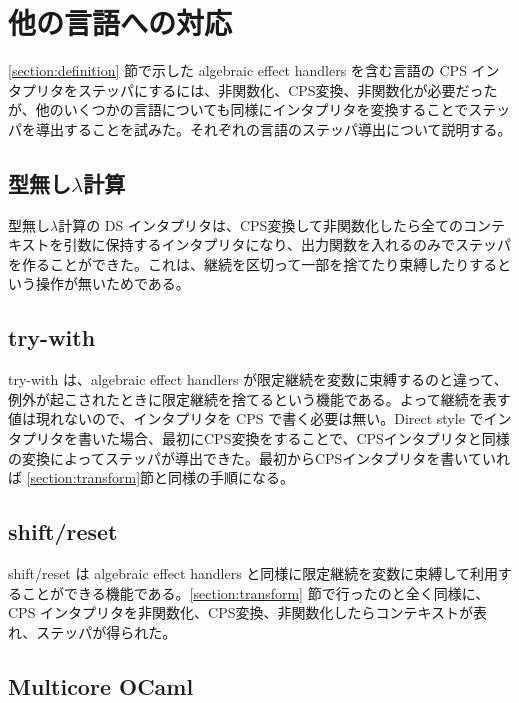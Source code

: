\section{他の言語への対応}
\label{section:languages}

\ref{section:definition} 節で示した algebraic effect handlers を含む言語の CPS インタプリタをステッパにするには、非関数化、CPS変換、非関数化が必要だったが、他のいくつかの言語についても同様にインタプリタを変換することでステッパを導出することを試みた。それぞれの言語のステッパ導出について説明する。


\subsection{型無し$\lambda$計算}
\label{subsection:lambda}

型無し$\lambda$計算の DS インタプリタは、CPS変換して非関数化したら全てのコンテキストを引数に保持するインタプリタになり、出力関数を入れるのみでステッパを作ることができた。これは、継続を区切って一部を捨てたり束縛したりするという操作が無いためである。


\subsection{try-with}
\label{subsection:try_with}

try-with は、algebraic effect handlers が限定継続を変数に束縛するのと違って、例外が起こされたときに限定継続を捨てるという機能である。よって継続を表す値は現れないので、インタプリタを CPS で書く必要は無い。Direct style でインタプリタを書いた場合、最初にCPS変換をすることで、CPSインタプリタと同様の変換によってステッパが導出できた。最初からCPSインタプリタを書いていれば \ref{section:transform}節と同様の手順になる。


\subsection{shift/reset}
\label{subsection:shift/reset}

shift/reset は algebraic effect handlers と同様に限定継続を変数に束縛して利用することができる機能である。\ref{section:transform} 節で行ったのと全く同様に、CPS インタプリタを非関数化、CPS変換、非関数化したらコンテキストが表れ、ステッパが得られた。


\subsection{Multicore OCaml}
\label{subsection:multicore_ocaml}

